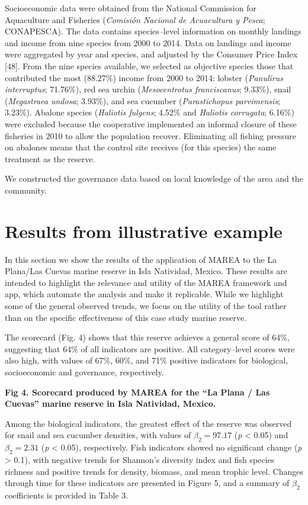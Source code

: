 \documentclass[12pt,]{article}
\begin{document}
Socioeconomic data were obtained from the National Commission for
Aquaculture and Fisheries (\emph{Comisión Nacional de Acuacultura y
Pesca}; CONAPESCA). The data contains species--level information on
monthly landings and income from nine species from 2000 to 2014. Data on
landings and income were aggregated by year and species, and adjusted by
the Consumer Price Index {[}48{]}. From the nine species available, we
selected as objective species those that contributed the most (88.27\%)
income from 2000 to 2014: lobster (\emph{Panulirus interruptus};
71.76\%), red sea urchin (\emph{Mesocentrotus franciscanus}; 9.33\%),
snail (\emph{Megastraea undosa}; 3.93\%), and sea cucumber
(\emph{Parastichopus parvimensis}; 3.23\%). Abalone species
(\emph{Haliotis fulgens}; 4.52\% and \emph{Haliotis corrugata}; 6.16\%)
were excluded because the cooperative implemented an informal closure of
these fisheries in 2010 to allow the population recover. Eliminating all
fishing pressure on abalones means that the control site receives (for
this species) the same treatment as the reserve.

We constructed the governance data based on local knowledge of the area
and the community.

\section{Results from illustrative
example}\label{results-from-illustrative-example}

In this section we show the results of the application of MAREA to the
La Plana/Las Cuevas marine reserve in Isla Natividad, Mexico. These
results are intended to highlight the relevance and utility of the MAREA
framework and app, which automate the analysis and make it replicable.
While we highlight some of the general observed trends, we focus on the
utility of the tool rather than on the specific effectiveness of this
case study marine reserve.

The scorecard (Fig. 4) shows that this reserve achieves a general score
of 64\%, suggesting that 64\% of all indicators are positive. All
category--level scores were also high, with values of 67\%, 60\%, and
71\% positive indicators for biological, socioeconomic and governance,
respectively.

\textbf{Fig 4. Scorecard produced by MAREA for the ``La Plana / Las
Cuevas'' marine reserve in Isla Natividad, Mexico.}

Among the biological indicators, the greatest effect of the reserve was
observed for snail and sea cucumber densities, with values of
\(\beta_2 = 97.17\) (\emph{p} \textless{} 0.05) and \(\beta_2 = 2.31\)
(\emph{p} \textless{} 0.05), respectively. Fish indicators showed no
significant change (\emph{p} \textgreater{} 0.1), with negative trends
for Shannon's diversity index and fish species richness and positive
trends for density, biomass, and mean trophic level. Changes through
time for these indicators are presented in Figure 5, and a summary of
\(\beta_2\) coefficients is provided in Table 3.
\end{document}
